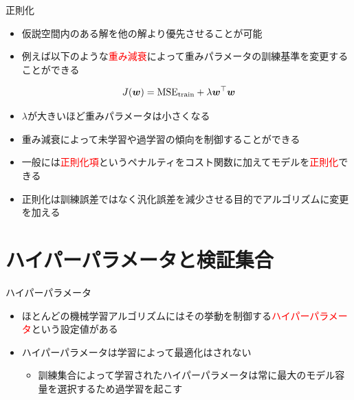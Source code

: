 \documentclass[dvipdfmx, 10pt]{beamer}
\begin{document}

\begin{frame}{正則化}
  \begin{itemize}
    \item 仮説空間内のある解を他の解より優先させることが可能
    \item 例えば以下のような\textcolor{red}{重み減衰}によって重みパラメータの訓練基準を変更することができる
  \end{itemize}
  \begin{equation}
    J(\bm{w}) = \mathrm{MSE}_{\rm train} + \lambda \bm{w}^{\top} \bm{w}
  \end{equation}
  \begin{itemize}
    \item $\lambda$が大きいほど重みパラメータは小さくなる
    \item 重み減衰によって未学習や過学習の傾向を制御することができる
    \item 一般には\textcolor{red}{正則化項}というペナルティをコスト関数に加えてモデルを\textcolor{red}{正則化}できる
    \item 正則化は訓練誤差ではなく汎化誤差を減少させる目的でアルゴリズムに変更を加える
  \end{itemize}
\end{frame}


\section{ハイパーパラメータと検証集合}


\begin{frame}{ハイパーパラメータ}
  \begin{itemize}
    \item ほとんどの機械学習アルゴリズムにはその挙動を制御する\textcolor{red}{ハイパーパラメータ}という設定値がある
    \item ハイパーパラメータは学習によって最適化はされない
    \begin{itemize}
      \item 訓練集合によって学習されたハイパーパラメータは常に最大のモデル容量を選択するため過学習を起こす
    \end{itemize}
  \end{itemize}
\end{frame}

\end{document}
